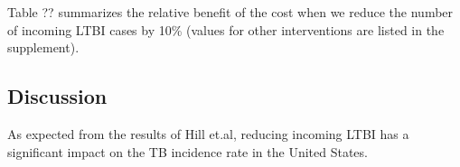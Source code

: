 \documentclass{article}[11pt]
\begin{document}
Table ?? summarizes the relative benefit of the cost when we reduce the number of incoming LTBI cases by 10\% (values for other interventions are listed in the supplement).

\subsection{Discussion}
As expected from the results of Hill et.al, reducing incoming LTBI has a significant impact on the TB incidence rate in the United States.
\end{document}
